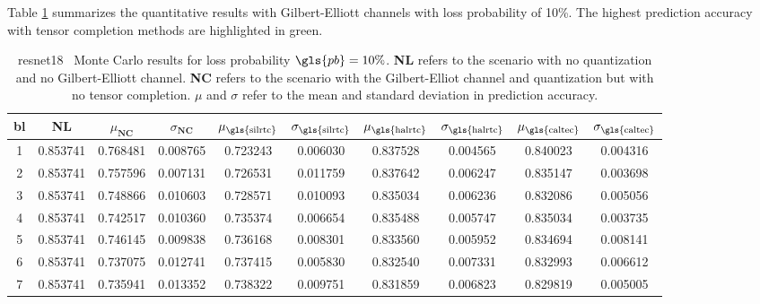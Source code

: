 Table \ref{table1:expts:mc:0.1} summarizes the quantitative results with Gilbert-Elliott channels with loss probability of 10\%. The highest prediction accuracy with tensor completion methods are highlighted in green.

\begin{table}[H]
	\caption[ResNet18 Monte Carlo results with 10 \% loss probability]{\gls{resnet18} \addone~Monte Carlo results for loss probability $\gls{pb} = 10\%$. \textbf{NL} refers to the scenario with no quantization and no Gilbert-Elliott channel. \textbf{NC} refers to the scenario with the Gilbert-Elliot channel and quantization but with no tensor completion. $\mu$ and $\sigma$ refer to the mean and standard deviation in prediction accuracy.} \label{table1:expts:mc:0.1}
	\centering
	\begin{adjustbox}{max width = \textwidth}
		\begin{tabular}{|c|c|cc|cc|cc|cc|}
			\hline
			\gls{bl} &  \textbf{NL} &  $\mu_{\textbf{NC}}$ &  $\sigma_{\textbf{NC}}$ &  $\mu_{\text{\gls{silrtc}}}$ &  $\sigma_{\text{\gls{silrtc}}}$ &  $\mu_{\text{\gls{halrtc}}}$ &  $\sigma_{\text{\gls{halrtc}}}$ &  $\mu_{\text{\gls{caltec}}}$ &  $\sigma_{\text{\gls{caltec}}}$ \\
			\hline \hline 
		1 &   0.853741 &             0.768481 &            0.008765 &     0.723243 &    0.006030 &     0.837528 &    0.004565 &    \cellcolor{green!25} 0.840023 &    0.004316 \\
		2 &   0.853741 &             0.757596 &            0.007131 &     0.726531 &    0.011759 &    \cellcolor{green!25} 0.837642 &    0.006247 &     0.835147 &    0.003698 \\
		3 &   0.853741 &             0.748866 &            0.010603 &     0.728571 &    0.010093 &    \cellcolor{green!25} 0.835034 &    0.006236 &     0.832086 &    0.005056 \\
		4 &   0.853741 &             0.742517 &            0.010360 &     0.735374 &    0.006654 &  \cellcolor{green!25}   0.835488 &    0.005747 &     0.835034 &    0.003735 \\
		5 &   0.853741 &             0.746145 &            0.009838 &     0.736168 &    0.008301 &  \cellcolor{green!25}   0.833560 &    0.005952 &     0.834694 &    0.008141 \\
		6 &   0.853741 &             0.737075 &            0.012741 &     0.737415 &    0.005830 &     0.832540 &    0.007331 &  \cellcolor{green!25}   0.832993 &    0.006612 \\
		7 &   0.853741 &             0.735941 &            0.013352 &     0.738322 &    0.009751 &   \cellcolor{green!25}  0.831859 &    0.006823 &     0.829819 &    0.005005 \\
			\hline 
		\end{tabular}
	\end{adjustbox}
\end{table}

